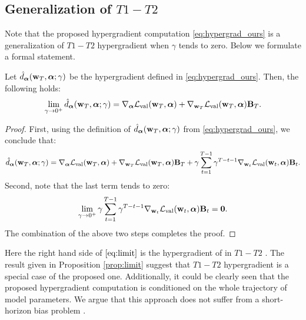 \subsection{Generalization of $T1-T2$}

Note that the proposed hypergradient computation \eqref{eq:hypergrad_ours} is a generalization of $T1-T2$ hypergradient \cite{luketina2016scalable} when $\gamma$ tends to zero. Below we formulate a formal statement.

\begin{proposition}\label{prop:limit}
    Let $\hat{d}_{\boldsymbol{\mathbf{\alpha}}}(\boldsymbol{\mathbf{w}}_T, \boldsymbol{\mathbf{\alpha}}; \gamma)$ be the hypergradient defined in \eqref{eq:hypergrad_ours}. Then, the following holds:
    \begin{align}\label{eq:limit}
        \lim_{\gamma \to 0^+}\hat{d}_{\boldsymbol{\mathbf{\alpha}}}(\boldsymbol{\mathbf{w}}_T, \boldsymbol{\mathbf{\alpha}}; \gamma) = \nabla_{\boldsymbol{\mathbf{\alpha}}}\mathcal{L}_{\mathrm{val}}(\boldsymbol{\mathbf{w}}_T, \boldsymbol{\mathbf{\alpha}}) + \nabla_{\boldsymbol{\mathbf{w}}_T}\mathcal{L}_{\mathrm{val}}(\boldsymbol{\mathbf{w}}_T, \boldsymbol{\mathbf{\alpha}})\boldsymbol{\mathbf{B}}_T.
    \end{align}
\end{proposition}

\begin{proof}
    First, using the definition of $\hat{d}_{\boldsymbol{\mathbf{\alpha}}}(\boldsymbol{\mathbf{w}}_T, \boldsymbol{\mathbf{\alpha}}; \gamma)$ from \eqref{eq:hypergrad_ours}, we conclude that:
    \begin{align*}
        \hat{d}_{\boldsymbol{\mathbf{\alpha}}}(\boldsymbol{\mathbf{w}}_T, \boldsymbol{\mathbf{\alpha}}; \gamma) = \nabla_{\boldsymbol{\mathbf{\alpha}}}\mathcal{L}_\text{val}(\boldsymbol{\mathbf{w}}_T, \boldsymbol{\mathbf{\alpha}}) + \nabla_{\boldsymbol{\mathbf{w}}_T}\mathcal{L}_{\mathrm{val}}(\boldsymbol{\mathbf{w}}_T, \boldsymbol{\mathbf{\alpha}})\boldsymbol{\mathbf{B}}_T + \gamma\sum_{t=1}^{T-1}\gamma^{T-t-1}\nabla_{\boldsymbol{\mathbf{w}}_t}\mathcal{L}_{\mathrm{val}}(\boldsymbol{\mathbf{w}}_t, \boldsymbol{\mathbf{\alpha}})\boldsymbol{\mathbf{B}}_t.
    \end{align*}
    Second, note that the last term tends to zero:
    \begin{align*}
        \lim_{\gamma\to0^+} \gamma\sum_{t=1}^{T-1}\gamma^{T-t-1}\nabla_{\boldsymbol{\mathbf{w}}_t}\mathcal{L}_{\mathrm{val}}(\boldsymbol{\mathbf{w}}_t, \boldsymbol{\mathbf{\alpha}})\boldsymbol{\mathbf{B}}_t = \boldsymbol{\mathbf{0}}.
    \end{align*}
    The combination of the above two steps completes the proof.
\end{proof}

Here the right hand side of $\eqref{eq:limit}$ is the hypergradient of in $T1-T2$ \cite{luketina2016scalable}. The result given in Proposition \ref{prop:limit} suggest that $T1-T2$ hypergradient is a special case of the proposed one. Additionally, it could be clearly seen that the proposed hypergradient computation is conditioned on the whole trajectory of model parameters. We argue that this approach does not suffer from a short-horizon bias problem \cite{wu2018understanding}.

